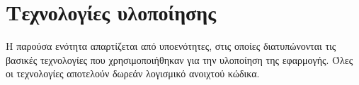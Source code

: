 \section{Τεχνολογίες υλοποίησης} \label{subsection:4-3-implementation-technology-stack}

Η παρούσα ενότητα απαρτίζεται από υποενότητες, στις οποίες διατυπώνονται τις βασικές τεχνολογίες που χρησιμοποιήθηκαν για την υλοποίηση της εφαρμογής. Όλες οι τεχνολογίες αποτελούν δωρεάν λογισμικό ανοιχτού κώδικα.






